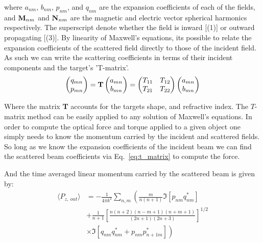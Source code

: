 where $a_{nm}$, $b_{nm}$, $p_{nm}$, and $q_{nm}$
are the expansion coefficients of each of the fields, and ${\bf M}_
{nm}$ and ${\bf N}_{nm}$ are the magnetic and electric vector 
spherical harmonics respectively. The superscript denote whether 
the field is inward [(1)] or outward propagating [(3)]. By linearity 
of Maxwell's equations, its possible to relate the expansion 
coefficients of the scattered field directly to those of the incident 
field. As such we can write the scattering coefficients in terms of 
their incident components and the target's 'T-matrix'.
\begin{align}
	\label{eq:t_matrix}
	\begin{pmatrix}
		q_{mn} \\
		p_{mn} 
	\end{pmatrix}
	= \bold{T} 
	\begin{pmatrix}
		a_{mn} \\
		b_{mn}
	\end{pmatrix}
	= \begin{pmatrix}
		T_{11} & T_{12} \\
		T_{21} & T_{22}
	\end{pmatrix}
	\begin{pmatrix}
		a_{mn} \\
		b_{mn}
	\end{pmatrix}
\end{align}

Where the matrix \textbf{T} accounts for the targets shape, 
and refractive index. The $T$-matrix method can be easily 
applied to any solution of Maxwell's equations. In order to compute 
the optical force and torque applied to a given object one simply 
needs to know the momentum carried by the incident and scattered 
fields. So long as we know the expansion coefficients of the 
incident beam we can find the scattered beam coefficients via Eq.~\eqref{eq:t_matrix} to compute the force.

And the time averaged linear momentum carried by the scattered 
beam is given by:
\begin{equation}
	\label{eq:linear_momentum_out}
	\begin{split}
		\langle P_{z,\ out} \rangle
		&=
		-\frac{1}{4\pi k^2}\sum_{n,m} \left(\frac{m}{n(n+1)}\Im[p_{nm}q^*_{nm}] \right.
		\\ 
		&+\frac{1}{n+1}\left[\frac{n(n+2)(n-m+1)(n+m+1)}{(2n+1)(2n+3)} \right]^{1/2}
		\\
		& \left.\times\Im[q_{nm}q^*_{nm}+p_{nm}p^*_{n+1m}] \right)
	\end{split}
\end{equation}

